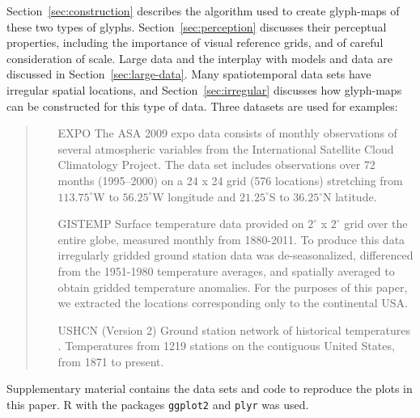 \documentclass[oneside]{article}
\begin{document}


Section~\ref{sec:construction} describes the algorithm used to create glyph-maps of these two types of glyphs. Section~\ref{sec:perception} discusses their perceptual properties, including the importance of visual reference grids, and of careful consideration of scale. Large data and the interplay with models and data are discussed in Section~\ref{sec:large-data}. Many spatiotemporal data sets have irregular spatial locations, and Section~\ref{sec:irregular} discusses how glyph-maps can be constructed for this type of data. Three datasets are used for examples:

\begin{quote}
\begin{itemize} \itemsep 0in

\item[EXPO] The ASA 2009 expo data \citep{murrell:2010} consists
  of monthly observations of several atmospheric variables from the
  International Satellite Cloud Climatology Project. The data set
  includes observations over 72 months (1995--2000) on a 24 x 24 grid
  (576 locations) stretching from $113.75^{\circ}$W to
  $56.25^{\circ}$W longitude and $21.25^{\circ}$S to $36.25{^\circ}$N
  latitude.

\item[GISTEMP] Surface temperature data provided on $2^{\circ}$ x
  $2^{\circ}$ grid over the entire globe, measured monthly
  \citep{GISTEMP} from 1880-2011. To produce this data irregularly
  gridded ground station data was de-seasonalized, differenced from
  the 1951-1980 temperature averages, and spatially averaged to obtain
  gridded temperature anomalies. For the purposes of this paper, we
  extracted the locations corresponding only to the continental USA.

\item[USHCN] (Version 2) Ground station network of historical
  temperatures \citep{USHCN}. Temperatures from 1219 stations on the
  contiguous United States, from 1871 to present.
  
\end{itemize}
\end{quote}
Supplementary material contains the data sets and code to reproduce the plots in this paper.  R \citep{R} with the packages {\tt ggplot2} \citep{me:ggplot2} and {\tt plyr} \citep{me:plyr} was used. 
\end{document}
